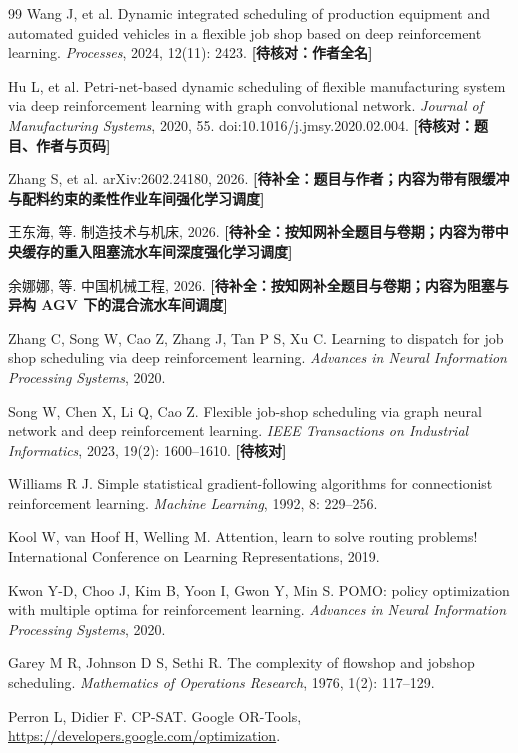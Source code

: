 \documentclass[11pt,a4paper]{ctexart}
\theoremstyle{definition}
\theoremstyle{remark}
\begin{document}
\begin{thebibliography}{99}
Wang J, et al. Dynamic integrated scheduling of production equipment and automated guided vehicles in a flexible job shop based on deep reinforcement learning.
\textit{Processes}, 2024, 12(11): 2423. \textbf{[待核对：作者全名]}

Hu L, et al. Petri-net-based dynamic scheduling of flexible manufacturing system via deep reinforcement learning with graph convolutional network.
\textit{Journal of Manufacturing Systems}, 2020, 55. doi:10.1016/j.jmsy.2020.02.004. \textbf{[待核对：题目、作者与页码]}

Zhang S, et al. arXiv:2602.24180, 2026. \textbf{[待补全：题目与作者；内容为带有限缓冲与配料约束的柔性作业车间强化学习调度]}

王东海, 等. 制造技术与机床, 2026. \textbf{[待补全：按知网补全题目与卷期；内容为带中央缓存的重入阻塞流水车间深度强化学习调度]}

余娜娜, 等. 中国机械工程, 2026. \textbf{[待补全：按知网补全题目与卷期；内容为阻塞与异构 AGV 下的混合流水车间调度]}

Zhang C, Song W, Cao Z, Zhang J, Tan P S, Xu C. Learning to dispatch for job shop scheduling via deep reinforcement learning.
\textit{Advances in Neural Information Processing Systems}, 2020.

Song W, Chen X, Li Q, Cao Z. Flexible job-shop scheduling via graph neural network and deep reinforcement learning.
\textit{IEEE Transactions on Industrial Informatics}, 2023, 19(2): 1600--1610. \textbf{[待核对]}

Williams R J. Simple statistical gradient-following algorithms for connectionist reinforcement learning.
\textit{Machine Learning}, 1992, 8: 229--256.

Kool W, van Hoof H, Welling M. Attention, learn to solve routing problems!
International Conference on Learning Representations, 2019.

Kwon Y-D, Choo J, Kim B, Yoon I, Gwon Y, Min S. POMO: policy optimization with multiple optima for reinforcement learning.
\textit{Advances in Neural Information Processing Systems}, 2020.

Garey M R, Johnson D S, Sethi R. The complexity of flowshop and jobshop scheduling.
\textit{Mathematics of Operations Research}, 1976, 1(2): 117--129.

Perron L, Didier F. CP-SAT. Google OR-Tools, \url{https://developers.google.com/optimization}.

\end{thebibliography}
\end{document}
